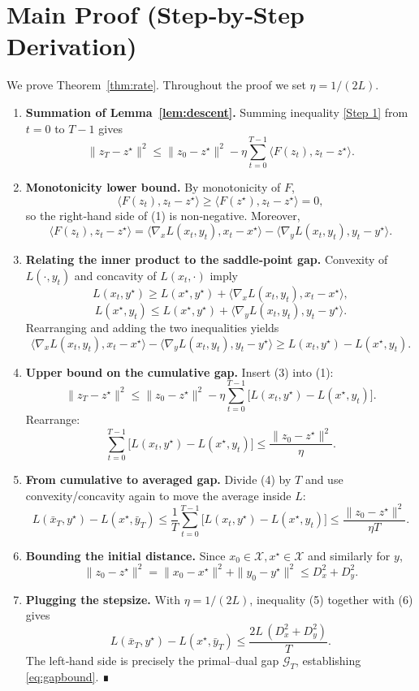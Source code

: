 \documentclass{article}
\begin{document}
\section*{Main Proof (Step‑by‑Step Derivation)}
We prove Theorem~\ref{thm:rate}.  Throughout the proof we set $\eta=1/(2L)$.

\begin{enumerate}[label=[Step \arabic*], leftmargin=*]
\item \textbf{Summation of Lemma~\ref{lem:descent}.}  
Summing inequality \eqref{Step 1} from $t=0$ to $T-1$ gives
\[
\|z_T-z^\star\|^2 \le \|z_0-z^\star\|^2 - \eta\sum_{t=0}^{T-1}\langle F(z_t),z_t-z^\star\rangle .\tag{1}
\]

\item \textbf{Monotonicity lower bound.}  
By monotonicity of $F$,
\[
\langle F(z_t),z_t-z^\star\rangle \ge 
\langle F(z^\star),z_t-z^\star\rangle =0,
\]
so the right‑hand side of (1) is non‑negative.  Moreover,
\[
\langle F(z_t),z_t-z^\star\rangle 
= \langle\nabla_x L(x_t,y_t),x_t-x^\star\rangle
   -\langle\nabla_y L(x_t,y_t),y_t-y^\star\rangle .\tag{2}
\]

\item \textbf{Relating the inner product to the saddle‑point gap.}  
Convexity of $L(\cdot ,y_t)$ and concavity of $L(x_t,\cdot)$ imply
\[
L(x_t,y^\star) \ge L(x^\star,y^\star) + \langle\nabla_x L(x_t,y_t),x_t-x^\star\rangle,
\]
\[
L(x^\star,y_t) \le L(x^\star,y^\star) + \langle\nabla_y L(x_t,y_t),y_t-y^\star\rangle .
\]
Rearranging and adding the two inequalities yields
\[
\langle\nabla_x L(x_t,y_t),x_t-x^\star\rangle
 -\langle\nabla_y L(x_t,y_t),y_t-y^\star\rangle
\ge L(x_t,y^\star)-L(x^\star,y_t). \tag{3}
\]

\item \textbf{Upper bound on the cumulative gap.}  
Insert (3) into (1):
\[
\|z_T-z^\star\|^2 \le \|z_0-z^\star\|^2 - \eta\sum_{t=0}^{T-1}\bigl[ L(x_t,y^\star)-L(x^\star,y_t) \bigr].
\]
Rearrange:
\[
\sum_{t=0}^{T-1}\bigl[ L(x_t,y^\star)-L(x^\star,y_t) \bigr]
\le \frac{\|z_0-z^\star\|^2}{\eta}. \tag{4}
\]

\item \textbf{From cumulative to averaged gap.}  
Divide (4) by $T$ and use convexity/concavity again to move the average inside $L$:
\[
L\!\left(\bar x_T ,y^\star\right) - L\!\left(x^\star ,\bar y_T\right)
\le \frac{1}{T}\sum_{t=0}^{T-1}\bigl[ L(x_t,y^\star)-L(x^\star,y_t) \bigr]
\le \frac{\|z_0-z^\star\|^2}{\eta T}. \tag{5}
\]

\item \textbf{Bounding the initial distance.}  
Since $x_0\in\mathcal{X},x^\star\in\mathcal{X}$ and similarly for $y$,
\[
\|z_0-z^\star\|^2 = \|x_0-x^\star\|^2 + \|y_0-y^\star\|^2
\le D_x^2 + D_y^2 .\tag{6}
\]

\item \textbf{Plugging the stepsize.}  
With $\eta=1/(2L)$, inequality (5) together with (6) gives
\[
L\!\left(\bar x_T ,y^\star\right) - L\!\left(x^\star ,\bar y_T\right)
\le \frac{2L\,(D_x^2+D_y^2)}{T}.
\]
The left‑hand side is precisely the primal–dual gap $\mathcal{G}_T$, establishing \eqref{eq:gapbound}. ∎
\end{enumerate}
\end{document}
